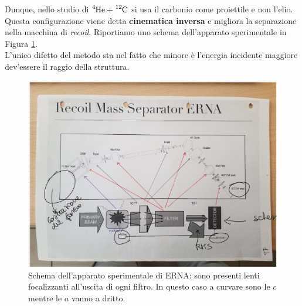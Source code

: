 Dunque, nello studio di $\ce{^4He} + \ce{^{12}C}$ si usa il carbonio come proiettile e non l'elio. Questa configurazione viene detta \textbf{cinematica inversa} e migliora la separazione nella macchina di \textit{recoil}. Riportiamo uno schema dell'apparato sperimentale in Figura \ref{0415_schema}.\\
L'unico difetto del metodo sta nel fatto che minore è l'energia incidente maggiore dev'essere il raggio %
della struttura.
\begin{figure}[!h]
	\centering
	\includegraphics[scale=0.5]{Immagini/0415_schema.png}
	\caption{Schema dell'apparato sperimentale di ERNA: sono presenti lenti focalizzanti all'uscita di ogni filtro. In questo caso a curvare sono le $c$ mentre le $a$ vanno a dritto.}
	\label{0415_schema}
\end{figure}







